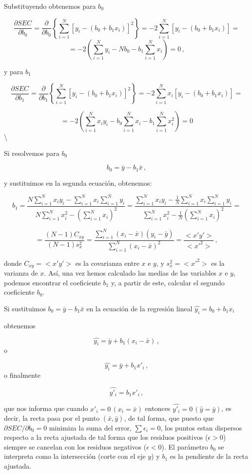 \documentclass[
]{agujournal2019}
\begin{document}
\noindent Substituyendo obtenemos para \(b_0\)

\[\frac{\partial{SEC}}{\partial{b_0}} =\frac{\partial}{\partial{b_0}}
  \left\{
    \sum^N_{i=1} [y_i - (b_0+b_1 x_i)]^2
  \right\}=
  -2\sum^N_{i=1} [y_i - (b_0+b_1 x_i)]=\]
\[=-2\left(\sum^N_{i=1}y_i -N b_0 - b_1\sum^N_{i=1} x_i  \right)=0\,,\]

y para \(b_1\)

\[\frac{\partial{SEC}}{\partial{b_1}} =\frac{\partial{}}{\partial{b_1}}
  \left\{
    \sum^N_{i=1} [y_i - (b_0+b_1 x_i)]^2
  \right\}=
-2\sum^N_{i=1} x_i [y_i - (b_0+b_1 x_i)]=\]

\[=-2\left(\sum^N_{i=1}x_i y_i - 
b_0\sum^N_{i=1}x_i - b_1\sum^N_{i=1} x^2_i \right)=0 \] \textbackslash{}

\noindent Si resolvemos para \(b_0\)

\[b_0=\bar{y}-b_1\bar{x}\,,\]

y sustituimos en la segunda ecuación, obtenemos:

\[b_1=\frac{N \sum\limits^N_{i=1} x_i y_i - \sum\limits^N_{i=1}x_i \sum\limits^N_{i=1}y_i}
           {N\sum\limits^N_{i=1}x^2_i-\left(\sum\limits^N_{i=1}x_i \right)^2}=
      \frac{\sum\limits^N_{i=1} x_i y_i - \frac{1}{N}\sum\limits^N_{i=1}x_i \sum\limits^N_{i=1}y_i}
           {\sum\limits^N_{i=1}x^2_i-\frac{1}{N}\left(\sum\limits^N_{i=1}x_i \right)^2}=\]

\[=\frac{(N-1)C_{xy}}{(N-1)s^2_x}=\frac{\sum\limits^N_{i=1} (x_i-\bar{x})(y_i-\bar{y})} {\sum\limits^N_{i=1} (x_i-\bar{x})^2}=\frac{<x'y'>}{<x'^2>}\,,\]

donde \(C_{xy}=<x'y'>\) es la covarianza entre \(x\) e \(y\), y
\(s^2_x=<x'^2>\) es la varianza de \(x\). Así, una vez hemos calculado
las medias de las variables \(x\) e \(y\), podemos encontrar el
coeficiente \(b_1\) y, a partir de este, calcular el segundo coeficiente
\(b_0\).

\noindent Si sustituimos \(b_0=\bar{y}-b_1\bar{x}\) en la ecuación de la
regresión lineal \(\hat{y_i}=b_0+b_1 x_i\)

obtenemos

\[\hat{y_i}=\bar{y} +b_1(x_i-\bar{x})\,,\] o

\[\hat{y_i}=\bar{y} +b_1{x'_i}\,,\] o finalmente

\[\hat{y'_i}=b_1{x'_i}\,,\]

que nos informa que cuando \(x'_i=0\,(x_i=\bar{x})\) entonces
\(\hat{y'_i}=0 \,(\hat{y}=\bar{y})\), es decir, la recta pasa por el
punto \((\bar{x},\bar{y})\), de tal forma, que puesto que
\(\partial{SEC}/{\partial{b_0}}=0\) minimiza la suma del error,
\(\sum \epsilon_i=0\), los puntos estan dispersos respecto a la recta
ajustada de tal forma que los residuos positivos (\(\epsilon>0\))
siempre se cancelan con los residuos negativos (\(\epsilon<0\)). El
parámetro \(b_0\) se interpreta como la intersección (corte con el eje
\(y\)) y \(b_1\) es la pendiente de la recta ajustada.
\end{document}

